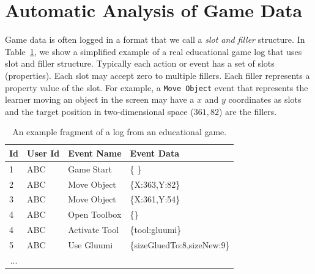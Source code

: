 \documentclass{sigchi}
\begin{document}
	
	\section{Automatic Analysis of Game Data}
	\label{sec:game_data}
	Game data is often logged  in a format that we call a \textit{slot and filler} structure.
	In Table~\ref{tbl:log_example}, we show a simplified example of a real educational game log that uses slot and filler structure.
	Typically each action or event has a set of slots (properties).
	Each slot may accept zero to multiple fillers. 
	Each filler represents a property value of the slot.
	For example, a \texttt{Move Object} event  that represents the learner moving an object in the screen may have a $x$ and $y$ coordinates as slots and the target position in two-dimensional space ($361, 82$) are the fillers.
	\newline
	
	\begin{table}[tbh]
		\begin{tabular}{@{}llll@{}}
			\toprule
			\textbf{Id}             & \textbf{User Id} & \textbf{Event Name} & \textbf{Event Data}        \\ \midrule
			1                       & ABC              & Game Start          & \{ \}                        \\
			2                       & ABC              & Move Object         & \{X:363,Y:82\} \\
			3                       & ABC              & Move Object         & \{X:361,Y:54\} \\
			4                       & ABC              & Open Toolbox        & \{\}        \\
			4                       & ABC              & Activate Tool        & \{tool:gluumi\}        \\
			5                       & ABC              & Use Gluumi        & \{sizeGluedTo:8,sizeNew:9\} \\        
			\multicolumn{1}{c}{...} &                  &                     &                            \\ \bottomrule
		\end{tabular}
		\caption{An example fragment of a log from an educational game. \label{tbl:log_example}}
	\end{table}
	
	
\end{document}
